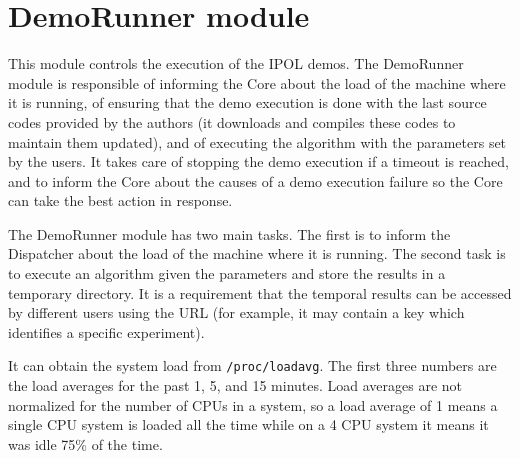 
\section{DemoRunner module}
\label{sec:DemoRunner}

This module controls the execution of the IPOL demos. The DemoRunner module is responsible of informing the Core about the load of the machine where it is running, of ensuring that the demo execution is done with the last source codes provided by the authors (it downloads and compiles these codes to maintain them updated), and of executing the algorithm with the parameters set by the users. It takes care of stopping the demo execution if a timeout is reached, and to inform the Core about the causes of a demo execution failure so the Core can take the best action in response.

The DemoRunner module has two main tasks. The first is to inform the Dispatcher about the load of the machine where it is running. The second task is to execute an algorithm given the parameters and store the results in a temporary directory. It is a requirement that the temporal results can be accessed by different users using the URL (for example, it may contain a key which identifies a specific experiment).

It can obtain the system load from {\tt /proc/loadavg}. The first three numbers are the load averages for the past 1, 5, and 15 minutes. Load averages are not normalized for the number of CPUs in a system, so a load  average  of 1 means a single CPU system is loaded all the time while on a 4 CPU system it means it was idle 75\% of the time.

